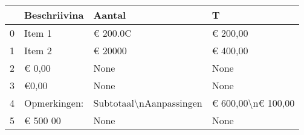 \begin{tabular}{llll}
\toprule
{} &  Beschriivina &                   Aantal &                   T \\
\midrule
0 &        Item 1 &                 € 200.0C &            € 200,00 \\
1 &        Item 2 &                  € 20000 &            € 400,00 \\
2 &        € 0,00 &                     None &                None \\
3 &         €0,00 &                     None &                None \\
4 &  Opmerkingen: &  Subtotaal\textbackslash nAanpassingen &  € 600,00\textbackslash n€ 100,00 \\
5 &      € 500 00 &                     None &                None \\
\bottomrule
\end{tabular}
